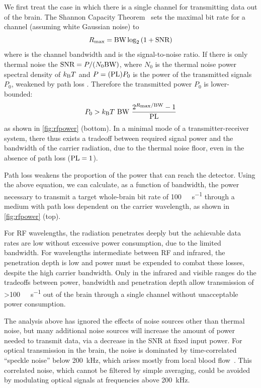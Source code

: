 We first treat the case in which there is a single channel for transmitting data out of the brain. The Shannon Capacity Theorem~\cite{cover06} sets the maximal bit rate for a channel (assuming white Gaussian noise) to
\[R_{\text{\scriptsize max}} = \text{BW} \log_2 \left(1 + \text{SNR}\right)\]
where \BW is the channel bandwidth and \SNR is the signal-to-noise ratio.
If there is only thermal noise the $\text{SNR} = P/(N_0 \text{BW})$, where $N_0$ is the thermal noise power spectral density of $k_{\text{\scriptsize B}} T$ and $P=(\text{PL})P_0$ is the power of the transmitted signals $P_0$, weakened by path loss \pathloss.
Therefore the transmitted power $P_0$ is lower-bounded:
\[P_0 > \kb T\ \BW\ \frac{2^{R\sub{max}/\BW}-1}{\pathloss}\]
as shown in \autoref{fig:rfpower} (bottom).
In a minimal mode of a transmitter-receiver system, there thus exists a tradeoff between required signal power and the bandwidth of the carrier radiation, due to the thermal noise floor, even in the absence of path loss ($\text{PL} = 1$).

Path loss weakens the proportion of the power that can reach the detector.
Using the above equation, we can calculate, as a function of bandwidth, the power necessary to transmit a target whole-brain bit rate of \SI{100}{\giga\bit\per\second} through a medium with path loss dependent on the carrier wavelength, as shown in \autoref{fig:rfpower} (top).

For RF wavelengths, the radiation penetrates deeply but the achievable data rates are low without excessive power consumption, due to the limited bandwidth.
For wavelengths intermediate between RF and infrared, the penetration depth is low and power must be expended to combat these losses, despite the high carrier bandwidth.
Only in the infrared and visible ranges do the tradeoffs between power, bandwidth and penetration depth allow transmission of \SI{>100}{\giga\bit\per\second} out of the brain through a single channel without unacceptable power consumption.

The analysis above has ignored the effects of noise sources other than thermal noise, but many additional noise sources will increase the amount of power needed to transmit data, via a decrease in the SNR at fixed input power.
For optical transmission in the brain, the noise is dominated by time-correlated ``speckle noise'' below \SI{200}{\kilo\hertz}, which arises mostly from local blood flow~\cite{carp11}.
This correlated noise, which cannot be filtered by simple averaging, could be avoided by modulating optical signals at frequencies above \SI{200}{\kHz}.

